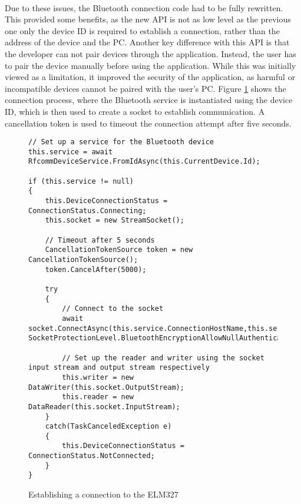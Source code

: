 		\paragraph{}{
		Due to these issues, the Bluetooth connection code had to be fully rewritten. This provided some benefits, as the new API is not as low level as the previous one only the device ID is required to establish a connection, rather than the address of the device and the PC. Another key difference with this API is that the developer can not pair devices through the application. Instead, the user has to pair the device manually before using the application. While this was initially viewed as a limitation, it improved the security of the application, as harmful or incompatible devices cannot be paired with the user's PC. Figure \ref{code:BTConnectionInit} shows the connection process, where the Bluetooth service is instantiated using the device ID, which is then used to create a socket to establish communication. A cancellation token is used to timeout the connection attempt after five seconds.
		}
		
		\begin{figure}[h]
			\begin{lstlisting}
// Set up a service for the Bluetooth device
this.service = await RfcommDeviceService.FromIdAsync(this.CurrentDevice.Id);

if (this.service != null)
{
	this.DeviceConnectionStatus = ConnectionStatus.Connecting;
	this.socket = new StreamSocket();

	// Timeout after 5 seconds
	CancellationTokenSource token = new CancellationTokenSource();
	token.CancelAfter(5000);

	try
	{
		// Connect to the socket
		await socket.ConnectAsync(this.service.ConnectionHostName,this.service.ConnectionServiceName, SocketProtectionLevel.BluetoothEncryptionAllowNullAuthentication).AsTask(token.Token);
	
		// Set up the reader and writer using the socket input stream and output stream respectively
		this.writer = new DataWriter(this.socket.OutputStream);
		this.reader = new DataReader(this.socket.InputStream);    		
	}
	catch(TaskCanceledException e)
	{
		this.DeviceConnectionStatus = ConnectionStatus.NotConnected;                            
	}
}
			\end{lstlisting}
			\caption{Establishing a connection to the ELM327}
			\label{code:BTConnectionInit}
		\end{figure}

